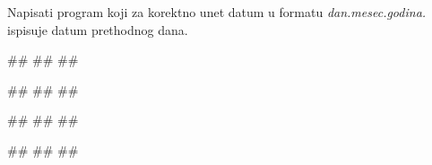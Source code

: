 \begin{Exercise}[label=KT_NG_29] 
 Napisati program koji za korektno unet datum u formatu \textit{dan.mesec.godina.} ispisuje datum prethodnog dana. 
 
\begin{miditest}
\begin{upotreba}{1}
#\naslovInt#
##
##
\end{upotreba}
\end{miditest}
\begin{miditest}
\begin{upotreba}{2}
#\naslovInt#
##
##
\end{upotreba}
\end{miditest}

\begin{miditest}
\begin{upotreba}{3}
#\naslovInt#
##
##
\end{upotreba}
\end{miditest}
\begin{miditest}
\begin{upotreba}{4}
#\naslovInt#
##
##
\end{upotreba}
\end{miditest}

\end{Exercise}
\ifresenja
 \begin{Answer}[ref=KT_NG_29]
\end{Answer}
\fi


